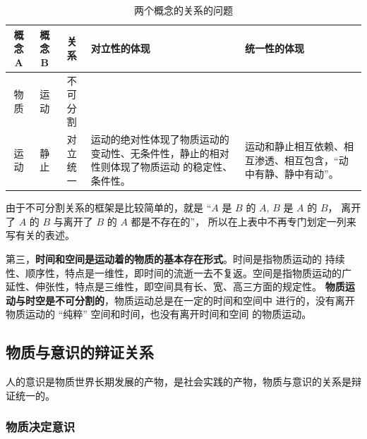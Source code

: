 \documentclass[10pt, UTF8]{book} %
\begin{document}
\begin{table}[H]
    \centering\small
    \caption{两个概念的关系的问题}
    \begin{tabular}{cc|c p{} p{}}
        \hline
        \textbf{概念 A} & \textbf{概念 B} & \textbf{关系} & \textbf{对立性的体现} & \textbf{统一性的体现} \\ 
        \hline
        物质 & 运动 & 不可分割 \\ 
        \hline
        运动 & 静止 & 对立统一 & 运动的绝对性体现了物质运动的变动性、无条件性，静止的相对性则体现了物质运动
        的稳定性、条件性。 & 运动和静止相互依赖、相互渗透、相互包含，“动中有静、静中有动”。 \\
        \hline
    \end{tabular}
    \begin{remark}
        由于不可分割关系的框架是比较简单的，就是 “$A$ 是 $B$ 的 $A$, $B$ 是 $A$ 的 $B$，
        离开了 $A$ 的 $B$ 与离开了 $B$ 的 $A$ 都是不存在的”，
        所以在上表中不再专门划定一列来写有关的表述。
    \end{remark}
\end{table}

第三，\textbf{时间和空间是运动着的物质的基本存在形式}。时间是指物质运动的
持续性、顺序性，特点是一维性，即时间的流逝一去不复返。空间是指物质运动的广
延性、伸张性，特点是三维性，即空间具有长、宽、高三方面的规定性。
\textbf{物质运动与时空是不可分割的}，物质运动总是在一定的时间和空间中
进行的，没有离开物质运动的 “纯粹” 空间和时间，也没有离开时间和空间
的物质运动。


\subsection{物质与意识的辩证关系}

人的意识是物质世界长期发展的产物，是社会实践的产物，物质与意识的关系是辩证统一的。

\subsubsection{物质决定意识}
\end{document}
